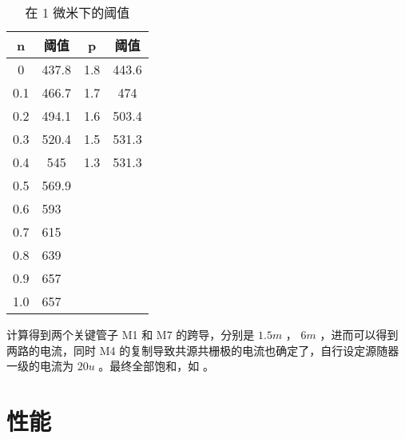 \documentclass[lang=cn,11pt,a4paper,cite=authoryear]{elegantpaper}
\begin{document}
\begin{table}[htb]
    \caption{在 1 微米下的阈值}
    \centering
    \label{t1}
    \begin{tabular}{cccc}
    \toprule
    n                       & 阈值                      & p                    & 阈值                   \\
    \midrule
    0                       & 437.8                   & 1.8                  & 443.6                \\
    0.1                     & 466.7                   & 1.7                  & 474                  \\
    0.2                     & 494.1                   & 1.6                  & 503.4                \\
    0.3                     & 520.4                   & 1.5                  & 531.3                \\
    0.4                     & 545                     & 1.3                  & 531.3                \\
    0.5                     & 569.9                   &                      &                      \\
    \multicolumn{1}{l}{0.6} & \multicolumn{1}{l}{593} & \multicolumn{1}{l}{} & \multicolumn{1}{l}{} \\
    \multicolumn{1}{l}{0.7} & \multicolumn{1}{l}{615} & \multicolumn{1}{l}{} & \multicolumn{1}{l}{} \\
    \multicolumn{1}{l}{0.8} & \multicolumn{1}{l}{639} & \multicolumn{1}{l}{} & \multicolumn{1}{l}{} \\
    \multicolumn{1}{l}{0.9} & \multicolumn{1}{l}{657} & \multicolumn{1}{l}{} & \multicolumn{1}{l}{} \\
    \multicolumn{1}{l}{1.0} & \multicolumn{1}{l}{657} & \multicolumn{1}{l}{} & \multicolumn{1}{l}{} \\ 
    \bottomrule
    \end{tabular}
\end{table}

计算得到两个关键管子 M1 和 M7 的跨导，分别是 \(1.5 m\) ， \(6 m\) ，进而可以得到两路的电流，同时 M4 的复制导致共源共栅极的电流也确定了，自行设定源随器一级的电流为 \(20 u\) 。最终全部饱和，如  。


\section{性能}
\end{document}
